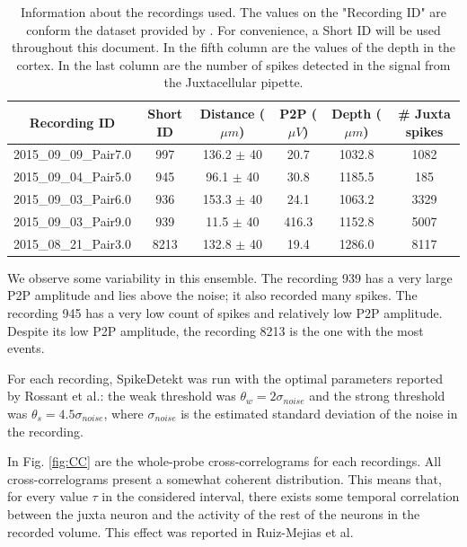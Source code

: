 \documentclass[10pt]{article}
\begin{document}
\begin{table}[!h]
\centering
\begin{tabular}{cccccc}
\textbf{Recording ID} & \textbf{Short ID} & \textbf{Distance ($\mu m$) } & \textbf{P2P ($\mu V$)} & \textbf{Depth ($\mu m$)} & \textbf{\# Juxta spikes}\\ \hline
2015\_09\_09\_Pair7.0 & 997 & 136.2 $\pm$ 40 & 20.7 & 1032.8 & 1082  \\ 
2015\_09\_04\_Pair5.0 & 945 & 96.1 $\pm$ 40 & 30.8 & 1185.5 & 185  \\
2015\_09\_03\_Pair6.0 & 936 & 153.3 $\pm$  40 & 24.1 & 1063.2 & 3329 \\
2015\_09\_03\_Pair9.0 & 939 & 11.5 $\pm$  40 & 416.3 & 1152.8 & 5007  \\
2015\_08\_21\_Pair3.0 & 8213 & 132.8 $\pm$ 40 & 19.4 & 1286.0 & 8117 \\ 
\end{tabular}
\caption{Information about the recordings used. The values on the "Recording ID" are conform the dataset provided by \cite{Netoetal}. For convenience, a Short ID will be used throughout this document. In the fifth column are the values of the depth in the cortex. In the last column are the number of spikes detected in the signal from the Juxtacellular pipette.}
\label{tab:sum-recordings}
\end{table}
We observe some variability in this ensemble. 
The recording 939 has a very large P2P amplitude and lies above the noise; it also recorded many spikes. 
The recording 945 has a very low count of spikes and relatively low P2P amplitude. Despite its low P2P amplitude, the recording 8213 is the one with the most events.

For each recording, SpikeDetekt was run with the optimal parameters reported by Rossant et al.: the weak threshold was $\theta_w = 2 \sigma_{noise}$ and the strong threshold was $\theta_s = 4.5 \sigma_{noise}$, where $\sigma_{noise}$ is the estimated standard deviation of the noise in the recording.

In Fig. \ref{fig:CC} are the whole-probe cross-correlograms for each recordings. All cross-correlograms present a somewhat coherent distribution. This means that, for every value $\tau$ in the considered interval, there exists some temporal correlation between the juxta neuron and the activity of the rest of the neurons in the recorded volume. This effect was reported in Ruiz-Mejias et al. \cite{ruiz2011slow}
\end{document}
